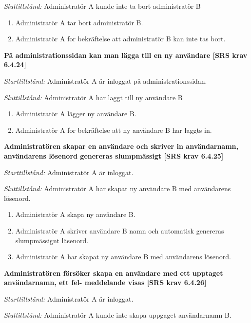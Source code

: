 \documentclass[a4paper]{article}
\begin{document}
\begin{FT}
\emph{Sluttillstånd:} Administratör A kunde inte ta bort  administratör B

\begin{enumerate}
\item Administratör A tar bort  administratör B.
\item Administratör A for bekräftelse att administratör B kan inte tas bort. 
\end{enumerate}

\item %
\textbf{På administrationssidan kan man lägga till en ny användare [SRS krav 6.4.24]}

\emph{Starttillstånd:} Administratör A är inloggat på administrationssidan.

\emph{Sluttillstånd:} Administratör A har laggt till ny  användare B

\begin{enumerate}
\item Administratör A lägger ny användare B.
\item Administratör A for bekräftelse att  ny användare B har laggts in. 
\end{enumerate}

\item %
\textbf{Administratören skapar en användare och skriver in användarnamn, användarens lösenord genereras slumpmässigt [SRS krav 6.4.25]}

\emph{Starttillstånd:} Administratör A är inloggat.

\emph{Sluttillstånd:} Administratör A har skapat  ny  användare B med användarens  lösenord.

\begin{enumerate}
\item Administratör A skapa ny användare B.
\item Administratör A skriver användare B namn och automatisk genereras slumpmässignt läsenord.
\item Administratör A har skapat  ny  användare B med användarens  lösenord.
\end{enumerate}

\item %
\textbf{Administratören försöker skapa en användare med ett upptaget användarnamn, ett fel- meddelande visas [SRS krav 6.4.26]}

\emph{Starttillstånd:} Administratör A är inloggat.

\emph{Sluttillstånd:} Administratör A kunde inte skapa uppgaget användarnamn B.


\end{FT}
\end{document}
